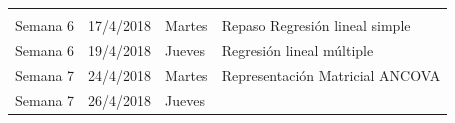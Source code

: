 \documentclass[]{book}
\theoremstyle{definition}
\theoremstyle{definition}
\theoremstyle{definition}
\theoremstyle{remark}
\begin{document}
\begin{longtable}[]{@{}llll@{}}
\begin{minipage}[t]{0.69\columnwidth}
\end{minipage}\tabularnewline
\begin{minipage}[t]{0.07\columnwidth}\raggedright
Semana 6\strut
\end{minipage} & \begin{minipage}[t]{0.07\columnwidth}\raggedright
17/4/2018\strut
\end{minipage} & \begin{minipage}[t]{0.05\columnwidth}\raggedright
Martes\strut
\end{minipage} & \begin{minipage}[t]{0.69\columnwidth}\raggedright
Repaso Regresión lineal simple\strut
\end{minipage}\tabularnewline
\begin{minipage}[t]{0.07\columnwidth}\raggedright
Semana 6\strut
\end{minipage} & \begin{minipage}[t]{0.07\columnwidth}\raggedright
19/4/2018\strut
\end{minipage} & \begin{minipage}[t]{0.05\columnwidth}\raggedright
Jueves\strut
\end{minipage} & \begin{minipage}[t]{0.69\columnwidth}\raggedright
Regresión lineal múltiple\strut
\end{minipage}\tabularnewline
\begin{minipage}[t]{0.07\columnwidth}\raggedright
Semana 7\strut
\end{minipage} & \begin{minipage}[t]{0.07\columnwidth}\raggedright
24/4/2018\strut
\end{minipage} & \begin{minipage}[t]{0.05\columnwidth}\raggedright
Martes\strut
\end{minipage} & \begin{minipage}[t]{0.69\columnwidth}\raggedright
Representación Matricial ANCOVA\strut
\end{minipage}\tabularnewline
\begin{minipage}[t]{0.07\columnwidth}\raggedright
Semana 7\strut
\end{minipage} & \begin{minipage}[t]{0.07\columnwidth}\raggedright
26/4/2018\strut
\end{minipage} & \begin{minipage}[t]{0.05\columnwidth}\raggedright
Jueves\strut
\end{minipage} & \begin{minipage}[t]{0.69\columnwidth}\raggedright

\end{minipage}
\end{longtable}
\end{document}
